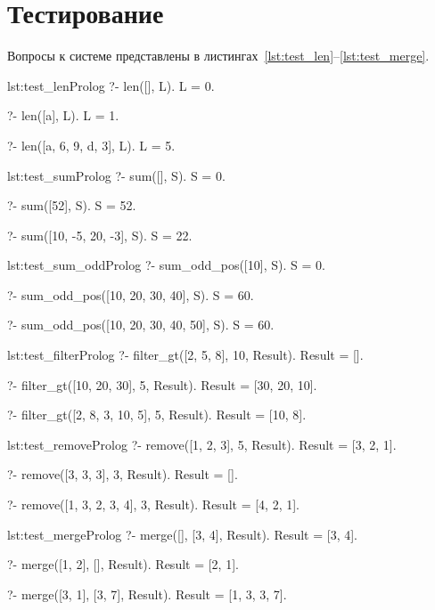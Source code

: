 \section{Тестирование}
Вопросы к системе представлены в листингах~\ref{lst:test_len}--\ref{lst:test_merge}.

\begin{listing}{lst:test_len}{Prolog}
?- len([], L).
L = 0.

?- len([a], L).
L = 1.

?- len([a, 6, 9, d, 3], L).
L = 5.
\end{listing}

\begin{listing}{lst:test_sum}{Prolog}
?- sum([], S).
S = 0.

?- sum([52], S).
S = 52.

?- sum([10, -5, 20, -3], S).
S = 22.
\end{listing}

\begin{listing}{lst:test_sum_odd}{Prolog}
?- sum_odd_pos([10], S).
S = 0.

?- sum_odd_pos([10, 20, 30, 40], S).
S = 60.

?- sum_odd_pos([10, 20, 30, 40, 50], S).
S = 60.
\end{listing}

\begin{listing}{lst:test_filter}{Prolog}
?- filter_gt([2, 5, 8], 10, Result).
Result = [].

?- filter_gt([10, 20, 30], 5, Result).
Result = [30, 20, 10].

?- filter_gt([2, 8, 3, 10, 5], 5, Result).
Result = [10, 8].
\end{listing}

\begin{listing}{lst:test_remove}{Prolog}
?- remove([1, 2, 3], 5, Result).
Result = [3, 2, 1].

?- remove([3, 3, 3], 3, Result).
Result = [].

?- remove([1, 3, 2, 3, 4], 3, Result).
Result = [4, 2, 1].
\end{listing}

\begin{listing}{lst:test_merge}{Prolog}
?- merge([], [3, 4], Result).
Result = [3, 4].

?- merge([1, 2], [], Result).
Result = [2, 1].

?- merge([3, 1], [3, 7], Result).
Result = [1, 3, 3, 7].
\end{listing}